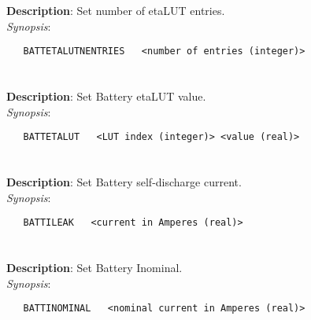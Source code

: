 \section{\quad{}}
\label{manpages:BATTETALUTNENTRIES}
\label{manpages:battetalutnentries}
\vspace{-0.1in}
{\bf Description}: 	Set number of etaLUT entries.\\[1.5ex]
{\em Synopsis}:
\vspace{-0.05in}
\scriptsize
\begin{lstlisting}
   BATTETALUTNENTRIES   <number of entries (integer)>																		
\end{lstlisting}
\normalsize
\vspace{-0.05in}


\section{\quad{}}
\label{manpages:BATTETALUT}
\label{manpages:battetalut}
\vspace{-0.1in}
{\bf Description}: 	Set Battery etaLUT value.\\[1.5ex]
{\em Synopsis}:
\vspace{-0.05in}
\scriptsize
\begin{lstlisting}
   BATTETALUT   <LUT index (integer)> <value (real)>																		
\end{lstlisting}
\normalsize
\vspace{-0.05in}


\section{\quad{}}
\label{manpages:BATTILEAK}
\label{manpages:battileak}
\vspace{-0.1in}
{\bf Description}: 	Set Battery self-discharge current.\\[1.5ex]
{\em Synopsis}:
\vspace{-0.05in}
\scriptsize
\begin{lstlisting}
   BATTILEAK   <current in Amperes (real)>																		
\end{lstlisting}
\normalsize
\vspace{-0.05in}


\section{\quad{}}
\label{manpages:BATTINOMINAL}
\label{manpages:battinominal}
\vspace{-0.1in}
{\bf Description}: 	Set Battery Inominal.\\[1.5ex]
{\em Synopsis}:
\vspace{-0.05in}
\scriptsize
\begin{lstlisting}
   BATTINOMINAL   <nominal current in Amperes (real)>																		
\end{lstlisting}
\normalsize
\vspace{-0.05in}


